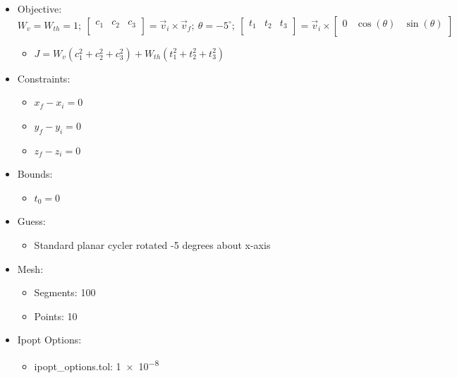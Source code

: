 \documentclass{article}
\begin{document}
\begin{itemize}
    \item Objective: $W_v = W_{th} = 1;\ \left[\begin{matrix}c_1&c_2&c_3\\\end{matrix}\right] = \vec{v}_i\times\vec{v}_f;\ \theta=-5^\circ;\ \left[\begin{matrix}t_1&t_2&t_3\\\end{matrix}\right] = \vec{v}_i\times\left[\begin{matrix}0&\cos\left(\theta\right)&\sin\left(\theta\right)\\\end{matrix}\right]$
    \begin{itemize}
        \item $J = W_v\left(c_1^2 + c_2^2 + c_3^2\right) + W_{th}\left(t_1^2 + t_2^2 + t_3^2\right)$
    \end{itemize}
    \item Constraints:
    \begin{itemize}
        \item $x_f - x_i = 0$
        \item $y_f - y_i = 0$
        \item $z_f - z_i = 0$
    \end{itemize}
    \item Bounds:
    \begin{itemize}
        \item $t_0 = 0$
    \end{itemize}
    \item Guess:
    \begin{itemize}
        \item Standard planar cycler rotated -5 degrees about x-axis
    \end{itemize}
    \item Mesh:
    \begin{itemize}
        \item Segments: 100
        \item Points: 10
    \end{itemize}
    \item Ipopt Options:
    \begin{itemize}
        \item ipopt\_options.tol: \num{1e-8}
    \end{itemize}
\end{itemize}
\end{document}
